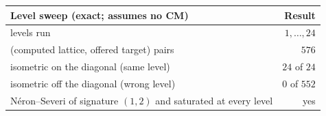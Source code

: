 \begin{tabular}{lr}
\toprule
Level sweep (exact; assumes no CM) & Result \\
\midrule
levels run & $1,\dots,24$ \\
(computed lattice, offered target) pairs & $576$ \\
isometric on the diagonal (same level) & $24$ of $24$ \\
isometric off the diagonal (wrong level) & $0$ of $552$ \\
N\'eron--Severi of signature $(1,2)$ and saturated at every level & yes \\
\bottomrule
\end{tabular}
